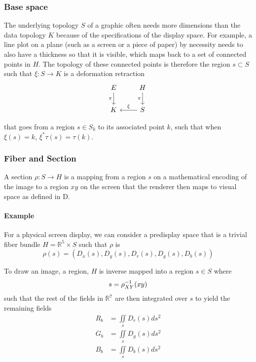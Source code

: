 \documentclass[../main.tex]{subfiles}
\begin{document}
\subsubsection{Base space}
The underlying topology $S$ of a graphic often needs more dimensions than the data topology $K$ because of the specifications of the display space. For example, a line plot on a plane (such as a screen or a piece of paper) by necessity needs to also have a thickness so that it is visible, which maps back to a set of connected points in $H$. The topology of these connected points is therefore the region $s \subset S$ such that $\xi: S \rightarrow K$ is a deformation retraction \cite{RetractionTopology2020}
\begin{equation}
    \begin{tikzcd}
        E \arrow[d, "\pi"'] & H \arrow[d, "\pi"'] \\
        K                   & S \arrow[l, "\xi"']
        \end{tikzcd}
\end{equation}

that goes from a region $s \in S_{k}$ to its associated point $k$, such that when $\xi(s) = k$, $\xi^*\tau(s) = \tau(k)$. 

\subsubsection{Fiber and Section}
A section $\rho: S \rightarrow H$ is a mapping from a region $s$ on a mathematical encoding of the image to a region $xy$ on the screen that the renderer then maps to visual space as defined in D.

\paragraph{Example}
For a physical screen display, we can consider a predisplay space that is a trivial fiber bundle $H=\mathbb{R}^{5}\times S$ such that $\rho$ is
\begin{equation}
    \rho(s)  = (D_x(s), D_y(s), D_r(s), D_g(s), D_b(s))
    \label{eq:rho}
\end{equation}

To draw an image, a region, $H$ is inverse mapped into a region $s \in S$ where %
\begin{equation}
s = \rho^{-1}_{\tiny{XY}}(xy)
\end{equation}
such that the rest of the fields in $\mathbb{R}^{7}$ are then integrated over $s$ to yield the remaining fields
\begin{align}
    R_b &= \iint\limits_s D_r(s)ds^{2}\\
    G_b &= \iint\limits_s D_g(s)ds^{2}\\
    B_b &= \iint\limits_s D_b(s)ds^{2}
\end{align}
\end{document}
